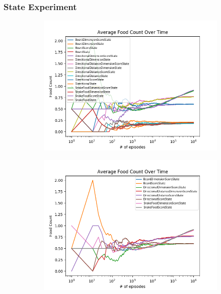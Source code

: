 \documentclass[result.tex]{subfiles}
\begin{document}
    \newpage

    \subsubsection*{State Experiment}

    \begin{figure}[ht]
        \centering
        \begin{subfigure}[b]{.35\linewidth}
            \includegraphics[width=\linewidth]{../images/qlearning/state/234/all_average_food_count_over_time.png}
        \end{subfigure}
        \begin{subfigure}[b]{.35\linewidth}
            \includegraphics[width=\linewidth]{../images/qlearning/state/234/score_dim_average_food_count_over_time.png}
        \end{subfigure}


\end{figure}
\end{document}
